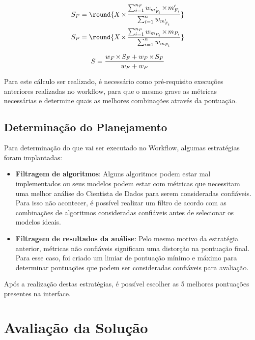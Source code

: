 \documentclass[twocolumn]{article}
\DeclarePairedDelimiter{\round}\lfloor\rceil
\let\oldtimes\times
\def\times{{\mkern1mu\oldtimes\mkern1mu}}
\begin{document}
\begin{equation}
\label{eqn:groupScores}
	\begin{aligned}
	S_F = \round{X \times \frac{\sum_{i=1}^{n_F} w_{m'_{F_i}} \times m'_{F_i}}{\sum_{i=1}^{n} w_{m'_{F_i}}}}\\
	S_P = \round{X \times \frac{\sum_{i=1}^{n_P} w_{m_{P_i}} \times m_{P_i}}{\sum_{i=1}^{n} w_{m_{P_i}}}}
	\end{aligned}
\end{equation}

\begin{equation}
\label{eqn:totalScore}
	S = \frac{w_F \times S_F + w_P \times S_P}{w_F + w_P}
\end{equation}

Para este cálculo ser realizado, é necessário como pré-requisito execuções anteriores realizadas no workflow, para que o mesmo grave as métricas necessárias e determine quais as melhores combinações através da pontuação.

\subsection{Determinação do Planejamento}

Para determinação do que vai ser executado no Workflow, algumas estratégias foram implantadas:

\begin{itemize}
	\item \textbf{Filtragem de algoritmos}: Alguns algoritmos podem estar mal implementados ou seus modelos podem estar com métricas que necessitam uma melhor análise do Cientista de Dados para serem consideradas confiáveis. Para isso não acontecer, é possível realizar um filtro de acordo com as combinações de algoritmos consideradas confiáveis antes de selecionar os modelos ideais.
	\item \textbf{Filtragem de resultados da análise}: Pelo mesmo motivo da estratégia anterior, métricas não confiáveis significam uma distorção na pontuação final. Para esse caso, foi criado um limiar de pontuação mínimo e máximo para determinar pontuações
que podem ser consideradas confiáveis para avaliação.
\end{itemize}

Após a realização destas estratégias, é possível escolher as 5 melhores pontuações presentes na interface.

\section{Avaliação da Solução}
\end{document}
